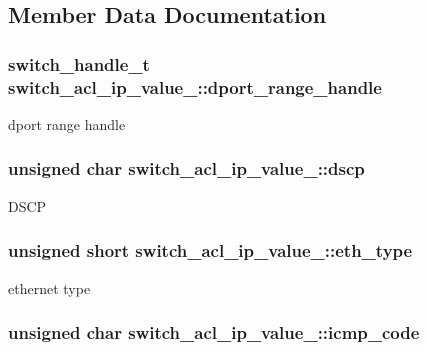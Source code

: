 \subsection{Member Data Documentation}
\hypertarget{unionswitch__acl__ip__value___ac2ae8fe982d3f5d4148c30a9b93e1edf}{
\subsubsection[{dport\+\_\+range\+\_\+handle}]{\setlength{\rightskip}{0pt plus 5cm}switch\+\_\+handle\+\_\+t switch\+\_\+acl\+\_\+ip\+\_\+value\+\_\+\+::dport\+\_\+range\+\_\+handle}}\label{unionswitch__acl__ip__value___ac2ae8fe982d3f5d4148c30a9b93e1edf}
dport range handle \hypertarget{unionswitch__acl__ip__value___a12422002b0ded28763363a1eb4c300a1}{
\subsubsection[{dscp}]{\setlength{\rightskip}{0pt plus 5cm}unsigned char switch\+\_\+acl\+\_\+ip\+\_\+value\+\_\+\+::dscp}}\label{unionswitch__acl__ip__value___a12422002b0ded28763363a1eb4c300a1}
D\+S\+C\+P \hypertarget{unionswitch__acl__ip__value___a450d8940dd6243b46ead5165dc6edab0}{
\subsubsection[{eth\+\_\+type}]{\setlength{\rightskip}{0pt plus 5cm}unsigned short switch\+\_\+acl\+\_\+ip\+\_\+value\+\_\+\+::eth\+\_\+type}}\label{unionswitch__acl__ip__value___a450d8940dd6243b46ead5165dc6edab0}
ethernet type \hypertarget{unionswitch__acl__ip__value___a6d310c1f72cf97ca30cd549785650424}{
\subsubsection[{icmp\+\_\+code}]{\setlength{\rightskip}{0pt plus 5cm}unsigned char switch\+\_\+acl\+\_\+ip\+\_\+value\+\_\+\+::icmp\+\_\+code}}\label{unionswitch__acl__ip__value___a6d310c1f72cf97ca30cd549785650424}
